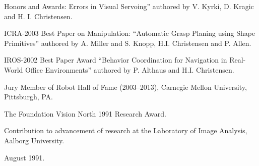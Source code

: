 \documentclass{article}
\newenvironment{sublist}{%
  \begin{list}{}{%
      \setlength{\itemsep}{0em}\setlength{\parsep}{0em}%
      \setlength{\topsep}{0em}\setlength{\parskip}{0em}%
    }%
}%
{ \end{list} }
\begin{document}
\begin{cv}
\begin{cvlist}{Honors and Awards:}
  Errors in Visual Servoing'' authored by V. Kyrki, D. Kragic and H.  I. Christensen.
\item ICRA-2003 Best Paper on Manipulation:  ``Automatic
  Grasp Planing using Shape Primitives'' authored by A. Miller and
  S. Knopp, H.I. Christensen and P. Allen.
\item IROS-2002 Best Paper Award ``Behavior Coordination for
  Navigation in Real-World Office Environments'' authored by
  P. Althaus and H.I. Christensen.
\item Jury Member of Robot Hall of Fame (2003--2013), Carnegie Mellon
  University, Pittsburgh, PA.
\item The Foundation Vision North 1991 Research Award.
  \begin{sublist}
  \item Contribution to advancement of research at the Laboratory of
    Image Analysis, Aalborg University.
  \item August 1991.
  \end{sublist}
\end{cvlist}
\end{cv}
\end{document}
